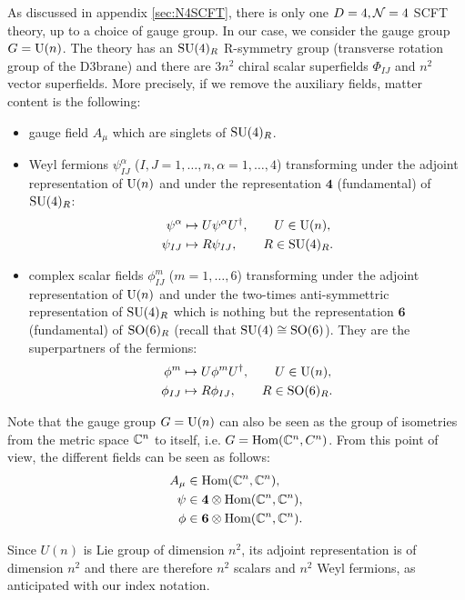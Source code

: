 \documentclass[a4paper,11pt]{article}
\begin{document}
        As discussed in appendix \ref{sec:N4SCFT}, there is only one $D=4,\mathcal{N}=4$ SCFT theory, up to a choice of gauge group. In our case, we consider the gauge group $G=\text{U}(n)$. The theory has an $\text{SU}(4)_R$ R-symmetry group (transverse rotation group of the D$3$brane) and there are $3n^2$ chiral scalar superfields $\Phi_{IJ}$ and $n^2$ vector superfields. More precisely, if we remove the auxiliary fields, matter content is the following:
        \begin{itemize}
            \item gauge field $A_\mu$ which are singlets of $\text{SU}(4)_R$.
            \item Weyl fermions $\psi^{\alpha}_{IJ}$ ($I,J=1,\dots,n,\alpha=1,\dots,4$) transforming under the adjoint representation of $\text{U}(n)$ and under the representation $\boldsymbol{4}$ (fundamental) of $\text{SU}(4)_R$:
            \begin{align}
                \psi^\alpha & \mapsto U \psi^\alpha U^\dagger ,\qquad U\in\text{U}(n),\\
                \psi_{IJ} & \mapsto R\psi_{IJ},\qquad R\in\text{SU}(4)_R.
            \end{align}
            \item complex scalar fields $\phi^{m}_{IJ}$ ($m=1,\dots,6$) transforming under the adjoint representation of $\text{U}(n)$ and under the two-times anti-symmettric representation of $\text{SU}(4)_R$ which is nothing but the representation $\boldsymbol{6}$ (fundamental) of $\text{SO}(6)_R$ (recall that $\text{SU}(4)\cong\text{SO}(6)$). They are the superpartners of the fermions:
            \begin{align}
                \phi^m & \mapsto U \phi^m U^\dagger ,\qquad U\in\text{U}(n),\\
                \phi_{IJ} & \mapsto R\phi_{IJ},\qquad R\in\text{SO}(6)_R.
            \end{align}
        \end{itemize}
        Note that the gauge group $G=\text{U}(n)$ can also be seen as the group of isometries from the metric space $\mathbb{C}^n$ to itself, i.e. $G=\text{Hom}(\mathbb{C}^n,C^n)$. From this point of view, the different fields can be seen as follows:
        \begin{align}
            A_\mu&\in\text{Hom}(\mathbb{C}^n,\mathbb{C}^n),\\
            \psi&\in\boldsymbol{4}\otimes\text{Hom}(\mathbb{C}^n,\mathbb{C}^n),\\
            \phi&\in\boldsymbol{6}\otimes\text{Hom}(\mathbb{C}^n,\mathbb{C}^n).
        \end{align}

        Since $U(n)$ is Lie group of dimension $n^2$, its adjoint representation is of dimension $n^2$ and there are therefore $n^2$ scalars and $n^2$ Weyl fermions, as anticipated with our index notation.
\end{document}
